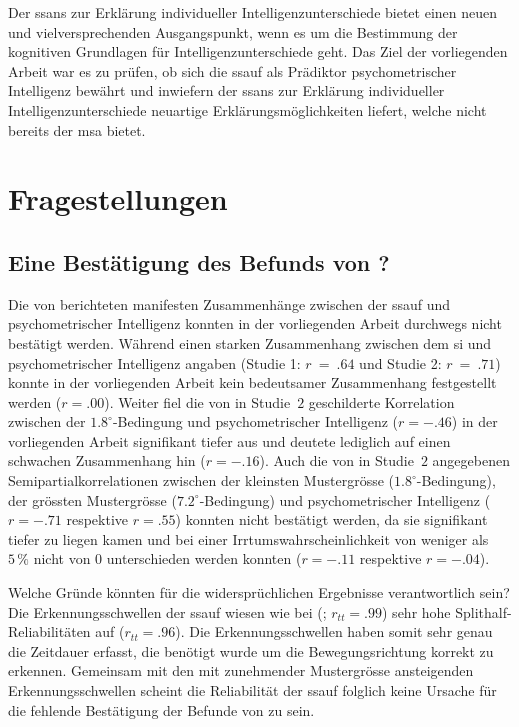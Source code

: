 \documentclass[11pt, twoside, a4paper]{book}		%
\begin{document}
Der \gls{ssans} zur Erklärung individueller Intelligenzunterschiede \citep{Melnick2013} bietet einen neuen und vielversprechenden Ausgangspunkt, wenn es um die Bestimmung der kognitiven Grundlagen für Intelligenzunterschiede geht.
Das Ziel der vorliegenden Arbeit war es zu prüfen, ob sich die \gls{ssauf} als Prädiktor psychometrischer Intelligenz bewährt und inwiefern der \gls{ssans} \citep{Melnick2013} zur Erklärung individueller Intelligenzunterschiede neuartige Erklärungsmöglichkeiten liefert, welche nicht bereits der \gls{msa} \citep[z. B.][]{Deary2000a, Jensen1982a, Jensen1982b, Jensen2006, Vernon1983} bietet. 



\section{Fragestellungen}

\subsection{Eine Bestätigung des Befunds von \citet{Melnick2013}?}

Die von \citeauthor{Melnick2013} berichteten manifesten Zusammenhänge zwischen der \gls{ssauf} und psychometrischer Intelligenz konnten in der vorliegenden Arbeit durchwegs nicht bestätigt werden. 
Während \citeauthor{Melnick2013} einen starken Zusammenhang zwischen dem \gls{si} und psychometrischer Intelligenz angaben (Studie 1: $r~=~.64$ und Studie 2: $r~=~.71$) konnte in der vorliegenden Arbeit kein bedeutsamer Zusammenhang festgestellt werden ($r=.00$). 
Weiter fiel die von \citeauthor{Melnick2013} in Studie~$2$ geschilderte Korrelation zwischen der $1.8^{\circ}$-Bedingung und psychometrischer Intelligenz ($r=-.46$) in der vorliegenden Arbeit signifikant tiefer aus und deutete lediglich auf einen schwachen Zusammenhang hin ($r=-.16$).
Auch die von \citeauthor{Melnick2013} in Studie~$2$ angegebenen Semipartialkorrelationen zwischen der kleinsten Mustergrösse ($1.8^{\circ}$-Bedingung), der grössten Mustergrösse ($7.2^{\circ}$-Bedingung) und psychometrischer Intelligenz ($r=-.71$ respektive $r=.55$) konnten nicht bestätigt werden, da sie signifikant tiefer zu liegen kamen und bei einer Irrtumswahrscheinlichkeit von weniger als $5\,\%$ nicht von $0$ unterschieden werden konnten ($r=-.11$ respektive $r=-.04$).

Welche Gründe könnten für die widersprüchlichen Ergebnisse verantwortlich sein? 
Die Erkennungsschwellen der \gls{ssauf} wiesen wie bei \citeauthor{Melnick2013} (\citeyear{Melnick2013}; $r_{tt} = .99$) sehr hohe Splithalf-Reliabilitäten auf ($r_{tt} = .96$). Die Erkennungsschwellen haben somit sehr genau die Zeitdauer erfasst, die benötigt wurde um die Bewegungsrichtung korrekt zu erkennen. 
Gemeinsam mit den mit zunehmender Mustergrösse ansteigenden Erkennungsschwellen scheint die Reliabilität der \gls{ssauf} folglich keine Ursache für die fehlende Bestätigung der Befunde von \citeauthor{Melnick2013} zu sein.
\end{document}
